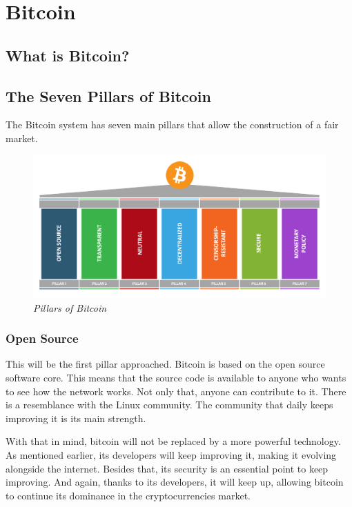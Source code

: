 \documentclass{article}
\newcommand\tab[1][1cm]{\hspace*{#1}}
\begin{document}
\section{Bitcoin}

\subsection{What is Bitcoin?}

\subsection{The Seven Pillars of Bitcoin}

\tab The Bitcoin system has seven main pillars that allow the construction of a fair market. 

\begin{figure}[H]
    \begin{center}
        \includegraphics[width=\textwidth]{images/pillars.png}
        \caption{\textit{Pillars of Bitcoin}}
    \end{center}
\end{figure}

\subsubsection{Open Source}

\tab This will be the first pillar approached. Bitcoin is based on the open source software core. This means that the source code is available to anyone who wants to see how the network works. Not only that, anyone can contribute to it. There is a resemblance with the Linux community. The community that daily keeps improving it is its main strength.

With that in mind, bitcoin will not be replaced by a more powerful technology. As mentioned earlier, its developers will keep improving it, making it evolving alongside the internet. Besides that, its security is an essential point to keep improving. And again, thanks to its developers, it will keep up, allowing bitcoin to continue its dominance in the cryptocurrencies market.
\end{document}
